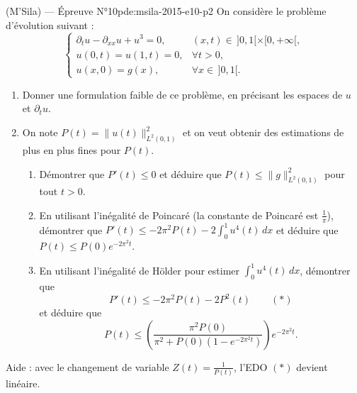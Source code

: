 \newpage
\begin{problem}{(M'Sila) — Épreuve N°10}{pde:msila-2015-e10-p2}
On considère le problème d'évolution suivant :
$$\begin{cases}\partial_tu-\partial_{xx}u+u^3=0, & (x,t)\in\,]0,1[\times[0,+\infty[,\\ u(0,t)=u(1,t)=0, & \forall t>0,\\ u(x,0)=g(x), & \forall x\in\,]0,1[.\end{cases}$$
\begin{enumerate}\item Donner une formulation faible de ce problème, en précisant les espaces de $u$ et $\partial_tu$.\item On note $P(t)=\lVert u(t)\rVert_{L^2(0,1)}^2$ et on veut obtenir des estimations de plus en plus fines pour $P(t)$.
\begin{enumerate}\item Démontrer que $P'(t)\leq0$ et déduire que $P(t)\leq\lVert g\rVert_{L^2(0,1)}^2$ pour tout $t>0$.\item En utilisant l'inégalité de Poincaré (la constante de Poincaré est $\frac1\pi$), démontrer que $P'(t)\leq-2\pi^2P(t)-2\int_0^1u^4(t)\,dx$ et déduire que $P(t)\leq P(0)e^{-2\pi^2t}$.\item En utilisant l'inégalité de Hölder pour estimer $\int_0^1u^4(t)\,dx$, démontrer que
$$P'(t)\leq-2\pi^2P(t)-2P^2(t)\qquad(*)$$
et déduire que
$$P(t)\leq\left(\frac{\pi^2P(0)}{\pi^2+P(0)\left(1-e^{-2\pi^2t}\right)}\right)e^{-2\pi^2t}.$$\end{enumerate}\end{enumerate}
Aide : avec le changement de variable $Z(t)=\frac1{P(t)}$, l'EDO $(*)$ devient linéaire.
\end{problem}
\newpage

